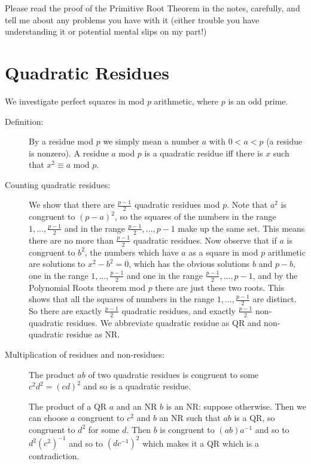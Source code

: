 \documentclass[12pt]{article}
\begin{document}
Please read the proof of the Primitive Root Theorem in the notes, carefully, and tell me about any problems you have with it (either trouble you have understanding it or potential mental slips on my part!)

\section{Quadratic Residues}

We investigate perfect squares in mod $p$ arithmetic, where $p$ is an odd prime.

\begin{description}

\item[Definition:]  By a residue mod $p$ we simply mean a number $a$ with $0 < a <p$ (a residue is nonzero).  A residue $a$ mod $p$ is a quadratic residue iff there is $x$ such that $x^2 \equiv a$ mod $p$.

\item[Counting quadratic residues:]  We show that there are $\frac{p-1}2$ quadratic residues mod $p$.   Note that $a^2$ is congruent to $(p-a)^2$, so the squares of the numbers in the range $1,\ldots,\frac{p-1}2$ and in the range $\frac{p-1}2,\ldots,p-1$ make up the same set.
This means there are no more than $\frac{p-1}2$ quadratic residues.   Now observe that if $a$ is congruent to $b^2$, the numbers which have $a$ as a square in mod $p$ arithmetic are solutions to $x^2-b^2=0$, which has the obvious solutions $b$ and $p-b$, one in  the range $1,\ldots,\frac{p-1}2$ and one in the range $\frac{p-1}2,\ldots,p-1$, and by the Polynomial Roots theorem mod $p$ there are just these two roots.   This shows that all the squares of numbers in the range $1,\ldots,\frac{p-1}2$
are distinct.  So there are exactly $\frac{p-1}2$ quadratic residues, and exactly $\frac{p-1}2$ non-quadratic residues.   We abbreviate quadratic residue as QR and non-quadratic residue as NR.

\item[Multiplication of residues and non-residues:]   The product $ab$ of two quadratic residues is congruent to some $c^2d^2=(cd)^2$ and so is a quadratic residue.

The product of a QR $a$ and an NR $b$ is an NR:  suppose otherwise.  Then we can choose $a$ congruent to $c^2$ and $b$ an NR such that $ab$ is a QR, so congruent to $d^2$ for some $d$.   Then $b$ is congruent to $(ab)a^{-1}$ and
so to $d^2(c^2)^{-1}$ and so to $(dc^{-1})^2$ which makes it a QR which is a contradiction.


\end{description}
\end{document}
